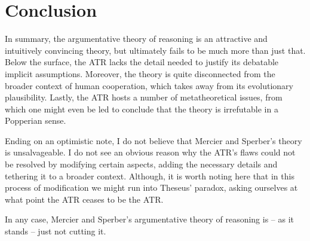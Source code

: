 \section{Conclusion}

In summary, the argumentative theory of reasoning is an attractive and intuitively convincing theory, but ultimately fails to be much more than just that. Below the surface, the ATR lacks the detail needed to justify its debatable implicit assumptions. Moreover, the theory is quite disconnected from the broader context of human cooperation, which takes away from its evolutionary plausibility. Lastly, the ATR hosts a number of metatheoretical issues, from which one might even be led to conclude that the theory is irrefutable in a Popperian sense.

Ending on an optimistic note, I do not believe that Mercier and Sperber's theory is unsalvageable. I do not see an obvious reason why the ATR's flaws could not be resolved by modifying certain aspects, adding the necessary details and tethering it to a broader context. Although, it is worth noting here that in this process of modification we might run into Theseus' paradox, asking ourselves at what point the ATR ceases to be the ATR.

In any case, Mercier and Sperber's argumentative theory of reasoning is -- as it stands -- just not cutting it.

